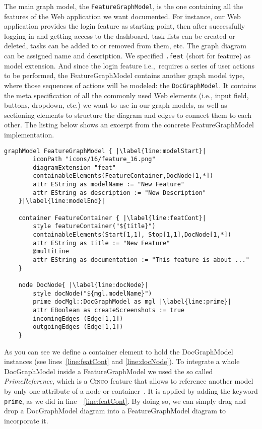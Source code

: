 The main graph model, the \lstinline{FeatureGraphModel}, is the one containing all the features of the Web application we want documented. For instance, our  Web application provides the login feature as starting point, then after successfully logging in and getting access to the dashboard, task lists can be created or deleted, tasks can be added to or removed from them, etc. The graph diagram can be assigned name and description. We specified \lstinline{.feat} (short for feature) as model extension. And since the login feature i.e.,~requires a series of user actions to be performed, the FeatureGraphModel contains another graph model type, where those sequences of actions will be modeled: the \lstinline{DocGraphModel}. It contains the meta specification of all the commonly used Web elements (i.e., input field, buttons, dropdown, etc.) we want to use in our graph models, as well as sectioning elements to structure the diagram and edges to connect them to each other. The listing below shows an excerpt from the concrete FeatureGraphModel implementation.

\begin{lstlisting}[language=MGL, caption={Excerpt from the feature.mgl, meta-specification of the FeatureGraphModel}, label=docMGL, escapechar=|]
    graphModel FeatureGraphModel { |\label{line:modelStart}|
        iconPath "icons/16/feature_16.png"
        diagramExtension "feat"
        containableElements(FeatureContainer,DocNode[1,*])
        attr EString as modelName := "New Feature"
        attr EString as description := "New Description"
    }|\label{line:modelEnd}|
    
    container FeatureContainer { |\label{line:featCont}|
        style featureContainer("${title}")
        containableElements(Start[1,1], Stop[1,1],DocNode[1,*])
        attr EString as title := "New Feature"
        @multiLine
        attr EString as documentation := "This feature is about ..."
    }
    
    node DocNode{ |\label{line:docNode}|
        style docNode("${mgl.modelName}")
        prime docMgl::DocGraphModel as mgl |\label{line:prime}|
        attr EBoolean as createScreenshots := true
        incomingEdges (Edge[1,1])
        outgoingEdges (Edge[1,1])
    }
\end{lstlisting}

As you can see we define a container element to hold the DocGraphModel instances (see lines~\ref{line:featCont} and \ref{line:docNode}). To integrate a whole DocGraphModel inside a FeatureGraphModel we used the so called \textit{PrimeReference}, which is a \textsc{Cinco} feature that allows to reference another model by only one attribute of a node or container~\cite{Cinco}. It is applied by adding the keyword \lstinline[language=MGL]{prime}, as we did in line~~\ref{line:featCont}. By doing so, we can simply drag and drop a DocGraphModel diagram into a FeatureGraphModel diagram to incorporate it.

